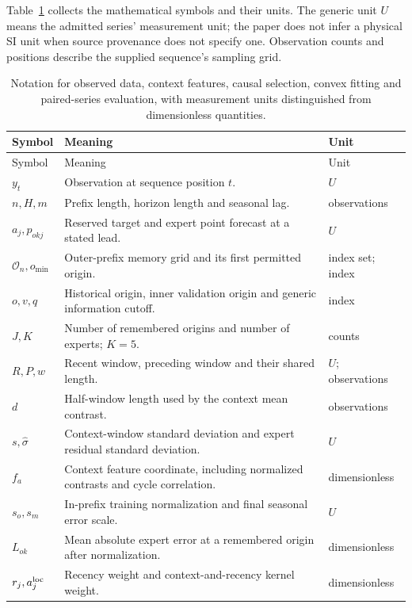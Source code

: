 Table~\ref{tab:notation} collects the mathematical symbols and their units. The generic unit $U$ means the admitted series' measurement unit; the paper does not infer a physical SI unit when source provenance does not specify one. Observation counts and positions describe the supplied sequence's sampling grid.

\begin{longtable}{>{\raggedright\arraybackslash}p{}>{\raggedright\arraybackslash}p{}>{\raggedright\arraybackslash}p{}}
\caption{Notation for observed data, context features, causal selection, convex fitting and paired-series evaluation, with measurement units distinguished from dimensionless quantities.}\label{tab:notation}\\
\toprule Symbol & Meaning & Unit\\\midrule\endfirsthead
\toprule Symbol & Meaning & Unit\\\midrule\endhead
$y_t$ & Observation at sequence position $t$. & $U$\\
$n,H,m$ & Prefix length, horizon length and seasonal lag. & observations\\
$a_j,p_{okj}$ & Reserved target and expert point forecast at a stated lead. & $U$\\
$\mathcal O_n,o_{\min}$ & Outer-prefix memory grid and its first permitted origin. & index set; index\\
$o,v,q$ & Historical origin, inner validation origin and generic information cutoff. & index\\
$J,K$ & Number of remembered origins and number of experts; $K=5$. & counts\\
$R,P,w$ & Recent window, preceding window and their shared length. & $U$; observations\\
$d$ & Half-window length used by the context mean contrast. & observations\\
$s,\widehat\sigma$ & Context-window standard deviation and expert residual standard deviation. & $U$\\
$f_a$ & Context feature coordinate, including normalized contrasts and cycle correlation. & dimensionless\\
$s_o,s_m$ & In-prefix training normalization and final seasonal error scale. & $U$\\
$L_{ok}$ & Mean absolute expert error at a remembered origin after normalization. & dimensionless\\
$r_j,a_j^{\rm loc}$ & Recency weight and context-and-recency kernel weight. & dimensionless\\

\end{longtable}
